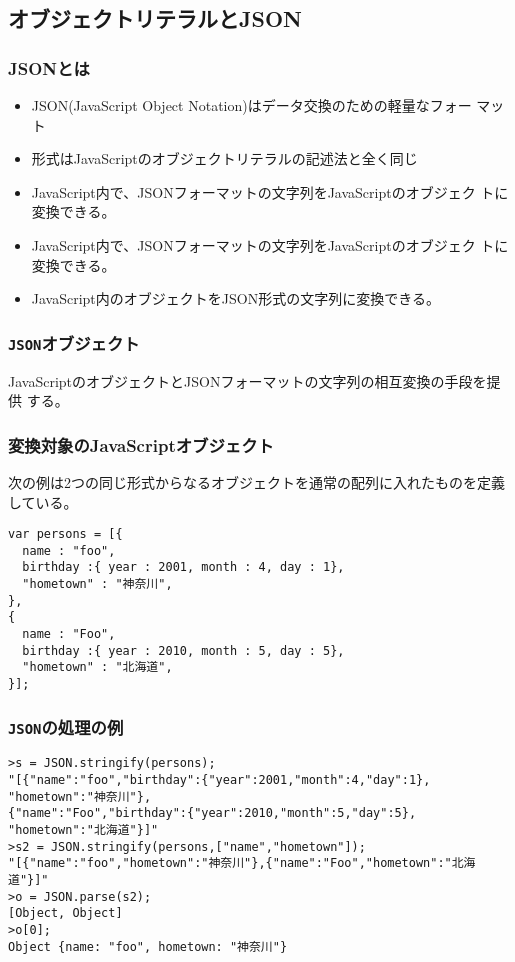 \subsection{オブジェクトリテラルとJSON}
\begin{frame}[containsverbatim]
\frametitle{JSONとは}
\begin{itemize}
 \item JSON(JavaScript Object Notation)はデータ交換のための軽量なフォー
       マット
 \item 形式はJavaScriptのオブジェクトリテラルの記述法と全く同じ
 \item JavaScript内で、JSONフォーマットの文字列をJavaScriptのオブジェク
       トに変換できる。
\item JavaScript内で、JSONフォーマットの文字列をJavaScriptのオブジェク
       トに変換できる。
 \item JavaScript内のオブジェクトをJSON形式の文字列に変換できる。
\end{itemize}
\end{frame}
\begin{frame}[containsverbatim]
\frametitle{\protect\texttt{JSON}オブジェクト}
JavaScriptのオブジェクトとJSONフォーマットの文字列の相互変換の手段を提供
する。
\end{frame}
\begin{frame}[containsverbatim]
\frametitle{変換対象のJavaScriptオブジェクト}
次の例は2つの同じ形式からなるオブジェクトを通常の配列に入れたものを定義
 している。
\begin{Verbatim}
var persons = [{
  name : "foo",
  birthday :{ year : 2001, month : 4, day : 1},
  "hometown" : "神奈川",
},
{
  name : "Foo",
  birthday :{ year : 2010, month : 5, day : 5},
  "hometown" : "北海道",
}];
\end{Verbatim}
\end{frame}
\begin{frame}[containsverbatim]
\frametitle{\protect\texttt{JSON}の処理の例}
\begin{Verbatim}
>s = JSON.stringify(persons);
"[{"name":"foo","birthday":{"year":2001,"month":4,"day":1},
"hometown":"神奈川"},
{"name":"Foo","birthday":{"year":2010,"month":5,"day":5},
"hometown":"北海道"}]"
>s2 = JSON.stringify(persons,["name","hometown"]);
"[{"name":"foo","hometown":"神奈川"},{"name":"Foo","hometown":"北海道"}]"
>o = JSON.parse(s2);
[Object, Object]
>o[0];
Object {name: "foo", hometown: "神奈川"}
\end{Verbatim}
\end{frame}
